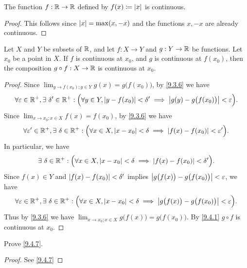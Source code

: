 \begin{prop}\label{9.4.12}
  The function \(f : \mathbb{R} \to \mathbb{R}\) defined by \(f(x) \coloneqq \left\lvert x\right\rvert\) is continuous.
\end{prop}

\begin{proof}
  This follows since \(\left\lvert x\right\rvert = \max(x, -x)\) and the functions \(x, -x\) are already continuous.
\end{proof}

\begin{prop}\label{9.4.13}
  Let \(X\) and \(Y\) be subsets of \(\mathbb{R}\), and let \(f : X \to Y\) and \(g : Y \to \mathbb{R}\) be functions.
  Let \(x_0\) be a point in \(X\).
  If \(f\) is continuous at \(x_0\), and \(g\) is continuous at \(f(x_0)\), then the composition \(g \circ f : X \to \mathbb{R}\) is continuous at \(x_0\).
\end{prop}

\begin{proof}
  Since \(\lim_{y \to f(x_0) ; y \in Y} g(x) = g\big(f(x_0)\big)\), by \cref{9.3.6} we have
  \[
    \forall \varepsilon \in \mathbb{R}^+, \exists\ \delta' \in \mathbb{R}^+ : \Big(\forall y \in Y, \left\lvert y - f(x_0)\right\rvert < \delta' \implies \left\lvert g(y) - g\big(f(x_0)\big)\right\rvert < \varepsilon\Big).
  \]
  Since \(\lim_{x \to x_0 ; x \in X} f(x) = f(x_0)\), by \cref{9.3.6} we have
  \[
    \forall \varepsilon' \in \mathbb{R}^+, \exists\ \delta \in \mathbb{R}^+ : \Big(\forall x \in X, \left\lvert x - x_0\right\rvert < \delta \implies \left\lvert f(x) - f(x_0)\right\rvert < \varepsilon'\Big).
  \]
  In particular, we have
  \[
    \exists\ \delta \in \mathbb{R}^+ : \Big(\forall x \in X, \left\lvert x - x_0\right\rvert < \delta \implies \left\lvert f(x) - f(x_0)\right\rvert < \delta'\Big).
  \]
  Since \(f(x) \in Y\) and \(\left\lvert f(x) - f(x_0)\right\rvert < \delta'\) implies \(\left\lvert g\big(f(x)\big) - g\big(f(x_0)\big)\right\rvert < \varepsilon\), we have
  \[
    \forall \varepsilon \in \mathbb{R}^+, \exists\ \delta \in \mathbb{R}^+ : \Big(\forall x \in X, \left\lvert x - x_0\right\rvert < \delta \implies \left\lvert g\big(f(x)\big) - g\big(f(x_0)\big)\right\rvert < \varepsilon\Big).
  \]
  Thus by \cref{9.3.6} we have \(\lim_{x \to x_0 ; x \in X} g\big(f(x)\big) = g\big(f(x_0)\big)\).
  By \cref{9.4.1} \(g \circ f\) is continuous at \(x_0\).
\end{proof}

\exercisesection

\begin{ex}\label{ex:9.4.1}
  Prove \cref{9.4.7}.
\end{ex}

\begin{proof}
  See \cref{9.4.7}
\end{proof}

